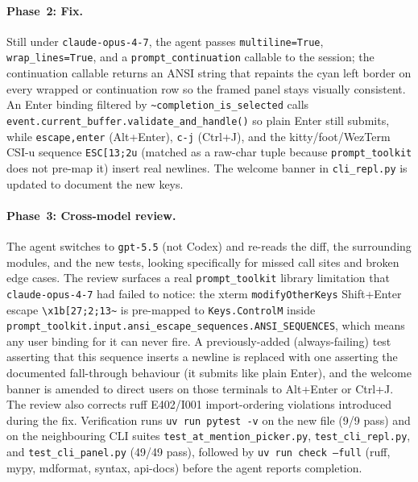 \documentclass{article}
\begin{document}
\paragraph{Phase~2: Fix.} Still under \texttt{claude-opus-4-7}, the agent passes \texttt{multiline=True}, \texttt{wrap\_lines=True}, and a \texttt{prompt\_continuation} callable to the session; the continuation callable returns an ANSI string that repaints the cyan \texttt{\textbar} left border on every wrapped or continuation row so the framed panel stays visually consistent.  An Enter binding filtered by \texttt{\textasciitilde completion\_is\_selected} calls \texttt{event.current\_buffer.validate\_and\_handle()} so plain Enter still submits, while \texttt{escape,enter} (Alt+Enter), \texttt{c-j} (Ctrl+J), and the kitty/foot/WezTerm CSI-u sequence \texttt{ESC[13;2u} (matched as a raw-char tuple because \texttt{prompt\_toolkit} does not pre-map it) insert real newlines.  The welcome banner in \texttt{cli\_repl.py} is updated to document the new keys.

\paragraph{Phase~3: Cross-model review.} The agent switches to \texttt{gpt-5.5} (not Codex) and re-reads the diff, the surrounding modules, and the new tests, looking specifically for missed call sites and broken edge cases.  The review surfaces a real \texttt{prompt\_toolkit} library limitation that \texttt{claude-opus-4-7} had failed to notice: the xterm \texttt{modifyOtherKeys} Shift+Enter escape \texttt{\textbackslash x1b[27;2;13\textasciitilde} is pre-mapped to \texttt{Keys.ControlM} inside \texttt{prompt\_toolkit.input.ansi\_escape\_sequences.ANSI\_SEQUENCES}, which means any user binding for it can never fire.  A previously-added (always-failing) test asserting that this sequence inserts a newline is replaced with one asserting the documented fall-through behaviour (it submits like plain Enter), and the welcome banner is amended to direct users on those terminals to Alt+Enter or Ctrl+J.  The review also corrects ruff E402/I001 import-ordering violations introduced during the fix.  Verification runs \texttt{uv run pytest -v} on the new file (9/9 pass) and on the neighbouring CLI suites \texttt{test\_at\_mention\_picker.py}, \texttt{test\_cli\_repl.py}, and \texttt{test\_cli\_panel.py} (49/49 pass), followed by \texttt{uv run check --full} (ruff, mypy, mdformat, syntax, api-docs) before the agent reports completion.
\end{document}
